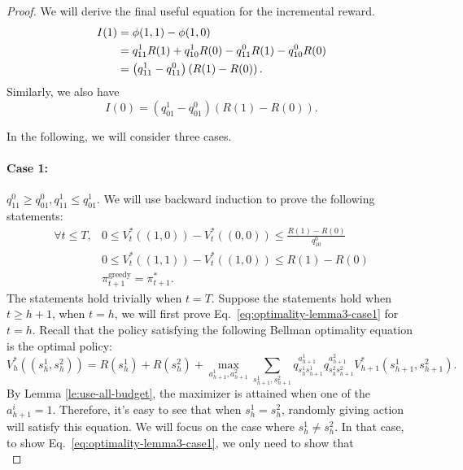 \begin{proof}
We will derive the final useful equation for the incremental reward.
\begin{align}
    I(1)&=\phi(1,1)-\phi(1,0)\notag\\
    &=q^1_{11}R(1)+q^1_{10}R(0)-q^0_{11}R(1)-q^0_{10}R(0)\\
    &=\left(q^1_{11}-q^0_{11}\right)\left(R(1)-R(0)\right).\label{eq:simplification-incremental-reward-1}
\end{align}
Similarly, we also have
\begin{equation}
    I(0)=\left(q^1_{01}-q^0_{01}\right)\left(R(1)-R(0)\right).\label{eq:simplification-incremental-reward-0}
\end{equation}

In the following, we will consider three cases. 
\paragraph{Case 1:}$q^0_{11}\geq q^0_{01},q^1_{11}\leq q^1_{01}$.
We will use backward induction to prove the following statements:
\begin{align}
    \forall t\leq T, &0\leq V_t^*\left((1,0)\right)-V_t^*((0,0))\leq \frac{R(1)-R(0)}{q^0_{10}}\label{eq:monotonicity-10-case1}\\
    &0\leq V_t^*\left((1,1)\right)-V_t^*((1,0))\leq R(1)-R(0)\label{eq:monotonicity-11-case1}\\
    &\pi_{t+1}^{\text{greedy}}=\pi_{t+1}^*.\label{eq:optimality-lemma3-case1}
\end{align}
The statements hold trivially when $t=T$. Suppose the statements hold when $t\geq h+1$, when $t=h$, we will first prove Eq.~\eqref{eq:optimality-lemma3-case1} for $t=h$. Recall that the policy satisfying the following Bellman optimality equation is the optimal policy:
    \begin{equation}\label{eq:bellman-optimality}
    V_h^*\left((s_h^1,s_h^2)\right)=R(s_h^1)+R(s_h^2)+\max_{a_{h+1}^1,a_{h+1}^2}\sum_{s_{h+1}^1,s_{h+1}^2}q^{a_{h+1}^1}_{s_h^1s_{h+1}^1}q^{a_{h+1}^2}_{s_h^2s_{h+1}^2}V_{h+1}^*\left(s_{h+1}^1,s_{h+1}^2\right).
    \end{equation}
By Lemma \ref{le:use-all-budget}, the maximizer is attained when one of the $a_{h+1}^i=1$. Therefore, it's easy to see that when $s_h^1=s_h^2$, randomly giving action will satisfy this equation. We will focus on the case where $s_h^1\neq s_h^2$. In that case, to show Eq.~\eqref{eq:optimality-lemma3-case1}, we only need to show that
      \begin{equation}

\end{equation}
\end{proof}
